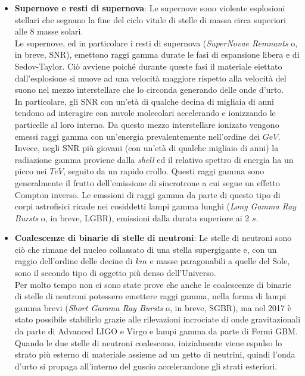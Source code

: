\documentclass[10pt]{article}
\begin{document}
\begin{itemize}
	\item \textbf{Supernove e resti di supernova}: Le supernove sono violente esplosioni stellari che segnano la fine del ciclo vitale di stelle di massa circa superiori alle 8 masse solari.\\ Le supernove, ed in particolare i resti di supernova (\textit{SuperNovae Remnants} o, in breve, SNR), emettono raggi gamma durate le fasi di espansione libera e di Sedov-Taylor. Ciò avviene poiché durante queste fasi il materiale eiettato dall'esplosione si muove ad una velocità maggiore rispetto alla velocità del suono nel mezzo interstellare che lo circonda \cite{SNRGR} generando delle onde d'urto.\\
	In particolare, gli SNR con un'età di qualche decina di migliaia di anni tendono ad interagire con nuvole molecolari accelerando e ionizzando le particelle al loro interno. Da questo mezzo interstellare ionizato vengono emessi raggi gamma con un'energia prevalentemente nell'ordine dei $ \unit{GeV} $.\\
	Invece, negli SNR più giovani (con un'età di qualche migliaio di anni) la radiazione gamma proviene dalla \textit{shell} ed il relativo spettro di energia ha un picco nei $ \unit{TeV} $, seguito da un rapido crollo. Questi raggi gamma sono generalmente il frutto dell'emissione di sincrotrone a cui segue un effetto Compton inverso. Le emssioni di raggi gamma da parte di questo tipo di corpi astrofisici ricade nei cosiddetti lampi gamma lunghi (\textit{Long Gamma Ray Bursts} o, in breve, LGBR), emissioni dalla durata superiore ai 2 $ \unit{s} $.
	\item \textbf{Coalescenze di binarie di stelle di neutroni}: Le stelle di neutroni sono ciò che rimane del nucleo collassato di una stella supergigante e, con un raggio dell'ordine delle decine di $ \unit{km} $ e masse paragonabili a quelle del Sole, sono il secondo tipo di oggetto più denso dell'Universo.\\
	Per molto tempo non ci sono state prove che anche le coalescenze di binarie di stelle di neutroni potessero emettere raggi gamma, nella forma di lampi gamma brevi (\textit{Short Gamma Ray Bursts} o, in breve, SGBR), ma nel 2017 è stato possibile stabilirlo grazie alle rilevazioni incrociate di onde gravitazionali da parte di Advanced LIGO e Virgo e lampi gamma da parte di Fermi GBM\cite{GWGRBNS}.\\
	Quando le due stelle di neutroni coalescono, inizialmente viene espulso lo strato più esterno di materiale assieme ad un getto di neutrini, quindi l'onda d'urto si propaga all'interno del guscio accelerandone gli strati esteriori.\\

\end{itemize}
\end{document}
